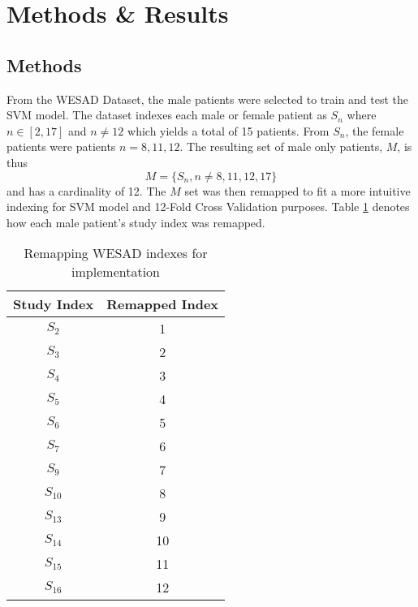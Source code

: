 \section{Methods \& Results}
\label{sec:methods-results}

\subsection{Methods}
\label{sec:methods}

From the WESAD Dataset, the male patients were selected to train and test the SVM model. 
The dataset indexes each male or female patient as $S_n$ where $n \in [2,17]$ and 
$n \ne 12$ which yields a total of 15 patients. From $S_n$, the female patients were patients 
$n=8,11,12$. The resulting set of male only patients, $M$, is thus 
$$ M = \{S_n,n \ne 8,11,12,17\} $$
and has a cardinality of 12. The $M$ set was then remapped to fit a more intuitive 
indexing for SVM model and 12-Fold Cross Validation purposes. Table \ref{table:remapping}
denotes how each male patient's study index was remapped. 

\begin{table}[h!]
\centering
\begin{tabular}{||c c||} 
\hline
Study Index & Remapped Index  \\ [0.5ex] 
\hline \hline
$S_2$ & 1  \\ 
\hline
$S_3$ & 2  \\ 
\hline
$S_4$ & 3  \\ 
\hline
$S_5$ & 4  \\ 
\hline
$S_6$ & 5  \\ 
\hline
$S_7$ & 6  \\ 
\hline
$S_9$ & 7  \\ 
\hline
$S_{10}$ & 8  \\ 
\hline
$S_{13}$ & 9  \\ 
\hline
$S_{14}$ & 10  \\ 
\hline
$S_{15}$ & 11  \\ 
\hline 
$S_{16}$ & 12  \\ 
\hline 
\hline
\end{tabular}
\caption{Remapping WESAD indexes for implementation}
\label{table:remapping}
\end{table}

